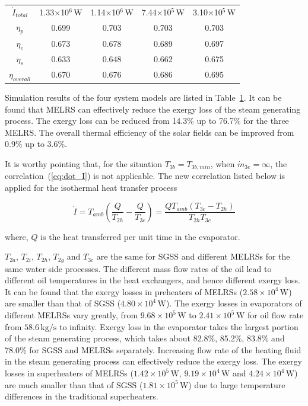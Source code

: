\begin{table}[htbp]
\begin{center}
\begin{tabular}{ccccc}
		$\dot{I}_{total}$    &    1.33$\times$10$^6\,\mathrm{W}$    &  1.14$\times$10$^6\,\mathrm{W}$  &	7.44$\times$10$^5\,\mathrm{W}$	&	3.10$\times$10$^5\,\mathrm{W}$\\
		$\eta_p$    &    0.699    &	0.703	&    0.703	&	0.703\\
		$\eta_e$    &    0.673    &	0.678	& 0.689	&	0.697\\
		$\eta_s$    &    0.633    &  0.648	&  0.662	&	0.675\\
		$\eta_{overall}$    &    0.670   &	0.676	&    0.686	&	0.695\\
		\bottomrule
	\end{tabular}
	\end{center}
	\label{tab:comparison}
\end{table}

Simulation results of the four system models are listed in Table~\ref{tab:comparison}. It can be found that MELRS can effectively reduce the exergy loss of the steam generating process. The exergy loss can be reduced from 14.3\% up to 76.7\% for the three MELRS. The overall thermal efficiency of the solar fields can be improved from 0.9\% up to 3.6\%.

It is worthy pointing that, for the situation $T_{3b} = T_{3b,min}$, when $\dot{m}_{3e} = \infty$, the correlation~(\ref{eq:dot_I}) is not applicable. The new correlation listed below is applied for the isothermal heat transfer process

\begin{equation}
  \dot{I} = T_{amb} (\frac{Q}{T_{2h}} - \frac{Q}{T_{3c}}) = \frac{QT_{amb}(T_{3c} - T_{2h})}{T_{2h}T_{3c}}
  \label{eq:isothermal}
\end{equation}

where, $Q$ is the heat transferred per unit time in the evaporator.

$T_{2a}$, $T_{2i}$, $T_{2h}$, $T_{2g}$ and $T_{3c}$ are the same for SGSS and different MELRSs for the same water side processes. The different mass flow rates of the oil lead to different oil temperatures in the heat exchangers, and hence different exergy loss. It can be found that the exergy losses in preheaters of MELRSs ($2.58\times 10^4\,\mathrm{W}$) are smaller than that of SGSS ($4.80\times10^4\,\mathrm{W}$). The exergy losses in evaporators of different MELRSs vary greatly, from $9.68\times10^5\,\mathrm{W}$ to $2.41\times10^5\,\mathrm{W}$ for oil flow rate from $58.6\,\mathrm{kg/s}$ to infinity.
Exergy loss in the evaporator takes the largest portion of the steam generating process, which takes about 82.8\%, 85.2\%, 83.8\% and 78.0\% for SGSS and MELRSs separately.
Increasing flow rate of the heating fluid in the steam generating process can effectively reduce the exergy loss.
The exergy losses in superheaters of MELRSs ($1.42\times 10^5\,\mathrm{W}$, $9.19\times 10^4\,\mathrm{W}$ and $4.24\times 10^4\,\mathrm{W}$) are much smaller than that of SGSS ($1.81\times10^5\,\mathrm{W}$) due to large temperature differences in the traditional superheaters.

